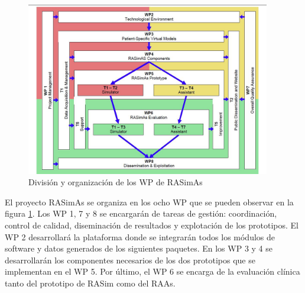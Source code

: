 
\begin{figure}
    \centering
    \includegraphics[width=0.95\textwidth]{IMG/wp_overview.jpg}
    \caption{División y organización de los \acl{WP} de \ac{RASimAs}}
    \label{fig:wp_rasimas}
\end{figure}

El proyecto \ac{RASimAs} se organiza en los ocho \ac{WP} que se pueden observar en la figura \ref{fig:wp_rasimas}. Los \ac{WP} 1, 7 y 8 se encargarán de tareas de gestión: coordinación, control de calidad, diseminación de resultados y explotación de los prototipos. El \ac{WP} 2 desarrollará la plataforma donde se integrarán todos los módulos de software y datos generados de los siguientes paquetes. En los \ac{WP} 3 y 4 se desarrollarán los componentes necesarios de los dos prototipos que se implementan en el \ac{WP} 5. Por último, el \ac{WP} 6 se encarga de la evaluación clínica tanto del prototipo de \ac{RASim} como del \ac{RAAs}.  
%



